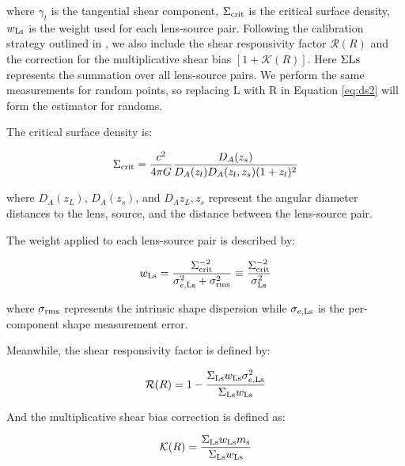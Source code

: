\documentclass[fleqn,usenatbib,useAMS,english]{mnras}
\begin{document}
    \noindent where $\gamma_{t}$ is the tangential shear component, $\Sigma_{\rm crit}$ is the
    critical surface density, $w_{\rm Ls}$ is the weight used for each lens-source pair.
    Following the calibration strategy outlined in \citet{HSC-WLCALIB}, we also include
    the shear responsivity factor $\mathcal{R}(R)$ and the correction for the multiplicative
    shear bias $[1+\mathcal{K}(R)]$.
    Here $\Sigma{\rm Ls}$ represents the summation over all lens-source pairs.
    We perform the same measurements for random points, so replacing L with R in
    Equation \ref{eq:ds2} will form the estimator for randoms.

    The critical surface density is:

    \begin{equation}
        \Sigma_{\rm crit}=\frac{c^2}{4\pi G} \frac{D_A(z_s)}{D_A(z_l) D_A(z_l, z_s) (1+z_l)^2}
        \label{eq:sigcrit}
    \end{equation}

    \noindent where $D_A(z_L)$, $D_A(z_s)$, and $D_A{z_L, z_s}$ represent the angular diameter
    distances to the lens, source, and the distance between the lens-source pair.

    The weight applied to each lens-source pair is described by:

    \begin{equation}
        w_{\rm Ls} = \frac{\Sigma_{\rm crit}^{-2}}{\sigma^2_{e, {\rm Ls}} + \sigma^2_{\rm rms}}
            \equiv \frac{\Sigma_{\rm crit}^{-2}}{\sigma^2_{{\rm Ls}}}
        \label{eq:weight}
    \end{equation}

    \noindent where $\sigma_{\rm rms}$ represents the intrinsic shape dispersion while
    $\sigma_{e, \rm Ls}$ is the per-component shape measurement error.

    Meanwhile, the shear responsivity factor is defined by:

    \begin{equation}
        \mathcal{R}(R) = 1 - \frac{\Sigma_{\rm Ls} w_{\rm Ls} \sigma^2_{e, {\rm Ls}}}{\Sigma_{\rm Ls} w_{\rm Ls}}
        \label{eq:rfactor}
    \end{equation}

    \noindent And the multiplicative shear bias correction is defined as:

    \begin{equation}
        \mathcal{K}(R) = \frac{\Sigma_{\rm Ls} w_{\rm Ls} m_{\rm s}}{\Sigma_{\rm Ls} w_{\rm Ls}}
        \label{eq:kfactor}
    \end{equation}
\end{document}

